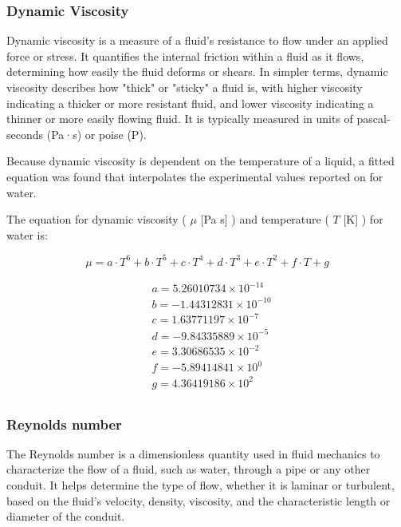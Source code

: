 \documentclass{homework}
\begin{document}
\begin{multicols}{2}
\subsubsection{Dynamic Viscosity}
		    
		  Dynamic viscosity is a measure of a fluid's resistance to flow under an applied force or stress. It quantifies the internal friction within a fluid as it flows, determining how easily the fluid deforms or shears. In simpler terms, dynamic viscosity describes how "thick" or "sticky" a fluid is, with higher viscosity indicating a thicker or more resistant fluid, and lower viscosity indicating a thinner or more easily flowing fluid. It is typically measured in units of pascal-seconds (Pa·s) or poise (P).  
		    
		  Because dynamic viscosity is dependent on the temperature of a liquid, a fitted equation was found that interpolates the experimental values reported on \cite{EngineeringToolBox_dynamic} for water.  
		    
		  The equation for dynamic viscosity ( $\mu$ [Pa s] ) and temperature ( $T$ [K] ) for water is:  
		    
		  $$
		  \mu = a \cdot T^6 + b \cdot T^5 + c \cdot T^4 + d \cdot T^3 + e \cdot T^2 + f \cdot T + g
		  $$  

            $$
            \begin{aligned}
            & a=5.26010734 \times 10^{-14} \\
            & b=-1.44312831 \times 10^{-10} \\
            & c=1.63771197 \times 10^{-7} \\
            & d=-9.84335889 \times 10^{-5} \\
            & e=3.30686535 \times 10^{-2} \\
            & f=-5.89414841 \times 10^{0} \\
            & g=4.36419186 \times 10^{2} \\
            \end{aligned}
            $$ 		  
      

\subsubsection{Reynolds number}
		    
    The Reynolds number is a dimensionless quantity used in fluid mechanics to characterize the flow of a fluid, such as water, through a pipe or any other conduit. It helps determine the type of flow, whether it is laminar or turbulent, based on the fluid's velocity, density, viscosity, and the characteristic length or diameter of the conduit.  
    

\end{multicols}
\end{document}
